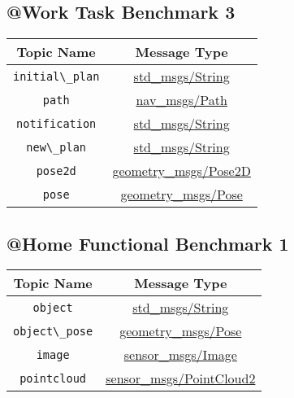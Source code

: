 \documentclass[a4paper]{article}
\begin{document}
\subsection{@Work Task Benchmark 3}
\begin{center}
\begin{tabular}{|c|c|}\hline
Topic Name & Message Type \\\hline\hline
\verb!initial\_plan! & \href{http://docs.ros.org/api/std\_msgs/html/msg/String.html}{std\_msgs/String} \\\hline
\verb!path! & \href{http://docs.ros.org/api/nav\_msgs/html/msg/Path.html}{nav\_msgs/Path} \\\hline
\verb!notification! & \href{http://docs.ros.org/api/std\_msgs/html/msg/String.html}{std\_msgs/String} \\\hline
\verb!new\_plan! & \href{http://docs.ros.org/api/std\_msgs/html/msg/String.html}{std\_msgs/String} \\\hline
\verb!pose2d! & \href{http://docs.ros.org/api/geometry\_msgs/html/msg/Pose2D.html}{geometry\_msgs/Pose2D} \\\hline
\verb!pose! & \href{http://docs.ros.org/api/geometry\_msgs/html/msg/Pose.html}{geometry\_msgs/Pose} \\\hline
\end{tabular}
\end{center}


\subsection{@Home Functional Benchmark 1}
\begin{center}
\begin{tabular}{|c|c|}\hline
Topic Name & Message Type \\\hline\hline
\verb!object! & \href{http://docs.ros.org/api/std\_msgs/html/msg/String.html}{std\_msgs/String} \\\hline
\verb!object\_pose! & \href{http://docs.ros.org/api/geometry\_msgs/html/msg/Pose.html}{geometry\_msgs/Pose} \\\hline
\verb!image! & \href{http://docs.ros.org/api/sensor\_msgs/html/msg/Image.html}{sensor\_msgs/Image} \\\hline
\verb!pointcloud! & \href{http://docs.ros.org/api/sensor\_msgs/html/msg/PointCloud2.html}{sensor\_msgs/PointCloud2} \\\hline
\end{tabular}
\end{center}
\end{document}
